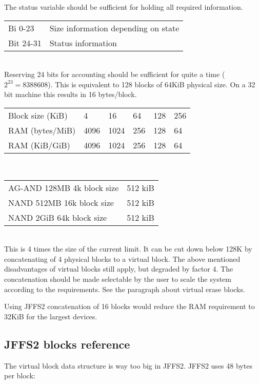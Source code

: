 \documentclass[12pt,a4paper,oneside,titlepage]{article}
\begin{document}
The status variable should be sufficient for holding all required
information.\\

\begin{tabular}{ll}
Bi  0-23  & Size information depending on state\\
Bit 24-31 & Status information\\
\end{tabular}\\

Reserving 24 bits for accounting should be sufficient for quite a time 
($2^23 = 8388608$). This is equivalent to 128 blocks of 64KiB physical size.
On a 32 bit machine this results in 16 bytes/block.\\

\begin{tabular}{llllll}
Block size (KiB) & 4    & 16   & 64  & 128 & 256\\
RAM (bytes/MiB)  & 4096 & 1024 & 256 & 128 &  64\\
RAM (KiB/GiB)    & 4096 & 1024 & 256 & 128 &  64\\
\end{tabular}\\[8pt]

\begin{tabular}{ll}
AG-AND 128MB 4k block size & 512 kiB\\
NAND 512MB 16k block size  & 512 kiB\\
NAND 2GiB 64k block size   & 512 kiB\\
\end{tabular}\\

This is 4 times the size of the current limit. It can be cut down
below 128K by concatenating of 4 physical blocks to a virtual
block. The above mentioned disadvantages of virtual blocks still
apply, but degraded by factor 4. The concatenation should be made
selectable by the user to scale the system according to the
requirements. See the paragraph about virtual erase blocks.

Using JFFS2 concatenation of 16 blocks would reduce the RAM
requirement to 32KiB for the largest devices.

\subsection{JFFS2 blocks reference} \label{ref_JFFS2_blk_ref}
The virtual block data structure is way too big in JFFS2.
JFFS2 uses 48 bytes per block:\\
\end{document}
